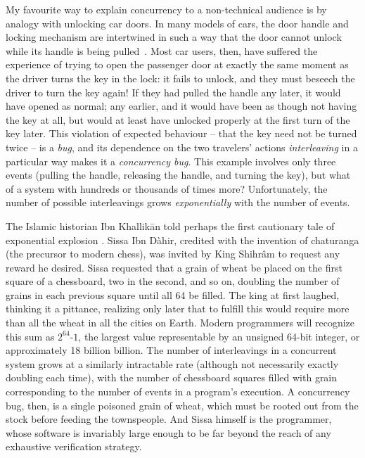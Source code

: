 {My favourite way to explain concurrency to a non-technical audience
is by analogy with unlocking car doors.
In many %
models of cars, the door handle and locking mechanism are intertwined
in such a way that the door cannot unlock while its handle is being pulled~\cite{car-doors}.
Most car users, then,
have suffered the experience of
trying to open the passenger door
at exactly the same moment as the driver turns the key in the lock:
it fails to unlock, and
they must beseech the driver to turn the key again!
If they had pulled the handle any later, it would have opened as normal;
any earlier, and it would have been as though not having the key at all,
but would at least have unlocked properly at the first turn of the key later.
This violation of expected behaviour -- that the key need not be turned twice --
is a {\em bug},
and its dependence on the two travelers' actions {\em interleaving}
in a particular way
makes it a {\em concurrency bug}.
This example involves only three events (pulling the handle, releasing the handle, and turning the key),
but what of a system with hundreds or thousands of times more?
Unfortunately, the number of possible interleavings grows {\em exponentially} with the number of events.

The Islamic historian Ibn Khallik\={a}n told perhaps the first cautionary tale of exponential explosion
\cite{ibn-khallikan,khallikān1868ibn}.
Sissa Ibn D\`{a}hir,
credited with the invention of chaturanga (the precursor to modern chess),
was invited by King Shihr\^{a}m to request any reward he desired.
Sissa requested that a grain of wheat be placed on the first square of a chessboard,
two in the second, and so on, doubling the number of grains in each previous square until all 64 be filled.
The king at first laughed, thinking it a pittance,
realizing only later that to fulfill this would require
more than all the wheat in all the cities on Earth.
Modern programmers will recognize this sum as $2^{64}$-$1$,
the largest value representable by an unsigned 64-bit integer,
or approximately 18 billion billion.
The number of interleavings in a concurrent system grows at a similarly intractable rate
(although not necessarily exactly doubling each time),
with the number of chessboard squares filled with grain corresponding to the number of events in a program's execution.
A concurrency bug, then, is a single poisoned grain of wheat,
which must be rooted out from the stock before feeding the townspeople.
And Sissa himself is the programmer,
whose software is invariably large enough to be far beyond the reach of any exhaustive verification strategy.
}

